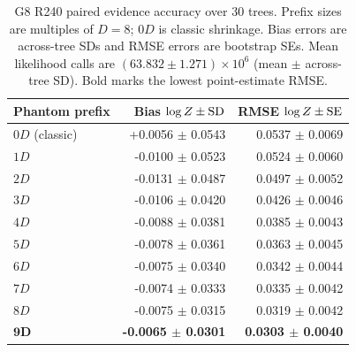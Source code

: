 \begin{table}[t]
\caption{G8 R240 paired evidence accuracy over 30 trees. Prefix sizes are multiples of $D=8$; $0D$ is classic shrinkage. Bias errors are across-tree SDs and RMSE errors are bootstrap SEs. Mean likelihood calls are $(63.832\pm1.271)\times10^6$ (mean $\pm$ across-tree SD). Bold marks the lowest point-estimate RMSE.}
\label{tab:phantom_evidence_g8}
\centering
\scriptsize
\begin{tabular}{lrr}
\toprule
Phantom prefix & Bias $\log Z\mathbin{\pm}{\rm SD}$ & RMSE $\log Z\mathbin{\pm}{\rm SE}$ \\
\midrule
$0D$ (classic) & +0.0056 $\pm$ 0.0543 & 0.0537 $\pm$ 0.0069 \\
$1D$ & -0.0100 $\pm$ 0.0523 & 0.0524 $\pm$ 0.0060 \\
$2D$ & -0.0131 $\pm$ 0.0487 & 0.0497 $\pm$ 0.0052 \\
$3D$ & -0.0106 $\pm$ 0.0420 & 0.0426 $\pm$ 0.0046 \\
$4D$ & -0.0088 $\pm$ 0.0381 & 0.0385 $\pm$ 0.0043 \\
$5D$ & -0.0078 $\pm$ 0.0361 & 0.0363 $\pm$ 0.0045 \\
$6D$ & -0.0075 $\pm$ 0.0340 & 0.0342 $\pm$ 0.0044 \\
$7D$ & -0.0074 $\pm$ 0.0333 & 0.0335 $\pm$ 0.0042 \\
$8D$ & -0.0075 $\pm$ 0.0315 & 0.0319 $\pm$ 0.0042 \\
$\boldsymbol{9D}$ & \textbf{-0.0065 $\pm$ 0.0301} & \textbf{0.0303 $\pm$ 0.0040} \\
\bottomrule
\end{tabular}
\end{table}


